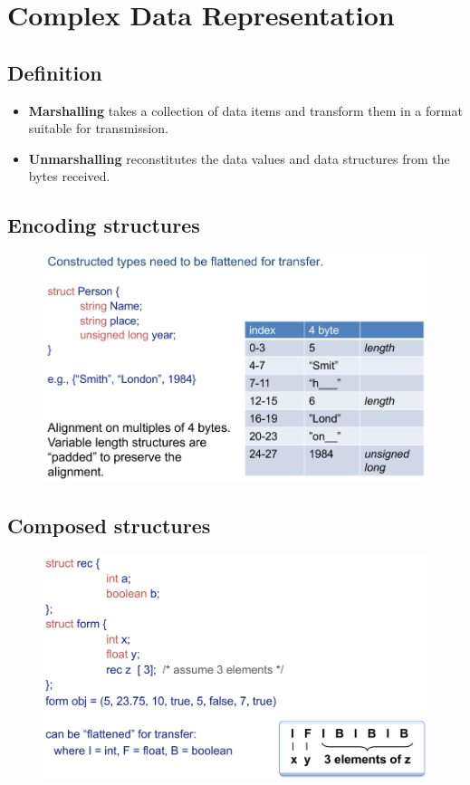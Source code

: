 \documentclass[twocolumn,landscape,10pt]{article}
\theoremstyle{definition}
\begin{document}
\section{Complex Data Representation}

\subsection{Definition}

\begin{itemize}
    \item \textbf{Marshalling} takes a collection of data items and transform
        them in a format suitable for transmission.
    \item \textbf{Unmarshalling} reconstitutes the data values and data
        structures from the bytes received.
\end{itemize} 

\subsection{Encoding structures}

\begin{figure}[h]
  	\includegraphics[scale=0.35]{encode_struct.png}
  	\centering
\end{figure}

\subsection{Composed structures}

\begin{figure}[h]
  	\includegraphics[scale=0.35]{composed_struct.png}
  	\centering
\end{figure}
\end{document}
